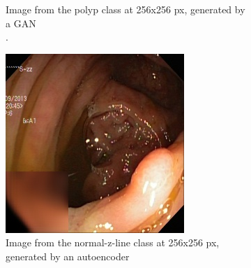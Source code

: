 \begin{figure}[t]
\begin{subfigure}[b]{0.4\textwidth}
            \caption[Hate to be this guy]%
            {{\small Image from the polyp class at 256x256 px, generated by a GAN \\.}}    
            \label{fig:polypGAN}
        \end{subfigure}
        \qquad\vfill%
        \begin{subfigure}[b]{0.4\textwidth}   
            \centering 
            \includegraphics[width=\textwidth]{experiments/figures/greensquare/polypAEN.jpg}
            \caption[]%
            {{\small Image from the normal-z-line class at 256x256 px, generated by an autoencoder }}    
            \label{fig:zAE}
        \end{subfigure}
        \qquad%
        \begin{subfigure}[b]{0.4\textwidth}   
            \centering 

\end{subfigure}
\end{figure}
